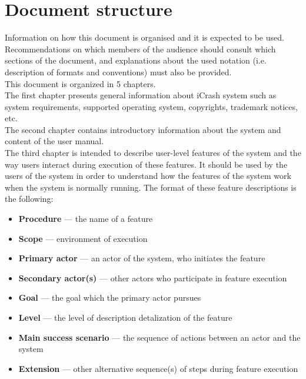 \section{Document structure}
Information on how this document is organised and it is expected to be used.
Recommendations on which members of the audience should consult which sections
of the document, and explanations about the used notation (i.e. description of
formats and conventions) must also be provided.\\
This document is organized in 5 chapters.\\
The first chapter presents general information about iCrash system such as
system requirements, supported operating system, copyrights, trademark notices,
etc.\\
The second chapter contains introductory information about the system and
content of the user manual.\\
The third chapter is intended to describe user-level features of the system and
the way users interact during execution of these features. It should be used by
the users of the system in order to understand how the features of the system
work when the system is normally running. The format of these feature
descriptions is the following:
\begin{itemize}
  \item \textbf{Procedure} --- the name of a feature
  \item \textbf{Scope} --- environment of execution
  \item \textbf{Primary actor} --- an actor of the system, who initiates the
  feature
  \item \textbf{Secondary actor(s)} --- other actors who participate in feature
  execution
  \item \textbf{Goal} --- the goal which the primary actor pursues
  \item \textbf{Level} --- the level of description detalization of the feature
  \item \textbf{Main success scenario} --- the sequence of actions between an
  actor and the system
  \item \textbf{Extension} --- other alternative sequence(s) of steps during
  feature execution
\end{itemize}

